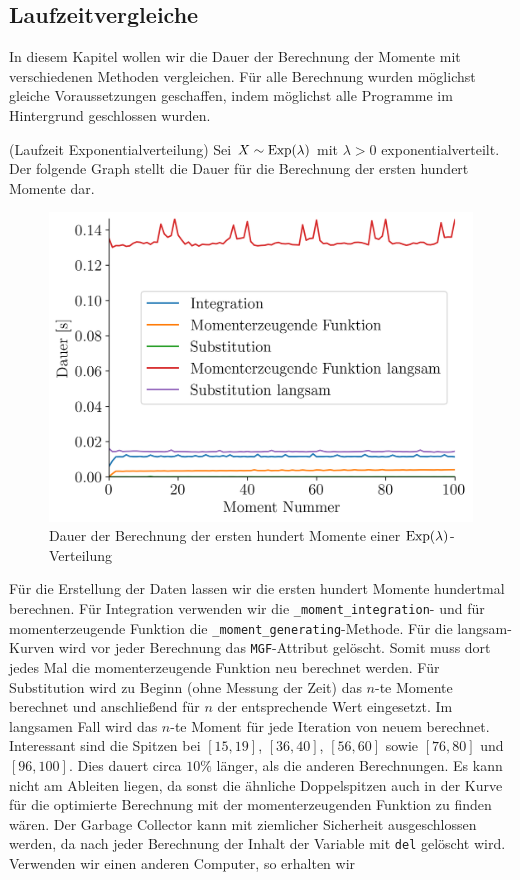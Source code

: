 \subsection{Laufzeitvergleiche}
\hypertarget{Sec:Laufzeit}{}

In diesem Kapitel wollen wir die Dauer der Berechnung der Momente mit verschiedenen Methoden vergleichen. Für alle Berechnung wurden möglichst gleiche Voraussetzungen geschaffen, indem möglichst alle Programme im Hintergrund geschlossen wurden.

\begin{Beispiel}{(Laufzeit Exponentialverteilung)}
Sei $X \sim \operatorname{Exp}(\lambda)$ mit $\lambda > 0$ exponentialverteilt. Der folgende Graph stellt die Dauer für die Berechnung der ersten hundert Momente dar.

\begin{figure}[H]
\centering
\includegraphics[width=0.5\linewidth]{./Section/Momente/Dauer Exp.png}
\vspace*{-.3\baselineskip}
\caption{Dauer der Berechnung der ersten hundert Momente einer $\operatorname{Exp}(\lambda)$-Verteilung}
\end{figure}

Für die Erstellung der Daten lassen wir die ersten hundert Momente hundertmal berechnen. Für Integration verwenden wir die \lstinline|_moment_integration|- und für momenterzeugende Funktion die \lstinline|_moment_generating|-Methode. Für die langsam-Kurven wird vor jeder Berechnung das \lstinline|MGF|-Attribut gelöscht. Somit muss dort jedes Mal die momenterzeugende Funktion neu berechnet werden. Für Substitution wird zu Beginn (ohne Messung der Zeit) das $n$-te Momente berechnet und anschließend für $n$ der entsprechende Wert eingesetzt. Im langsamen Fall wird das $n$-te Moment für jede Iteration von neuem berechnet.\\

Interessant sind die Spitzen bei $[15, 19]$, $[36, 40]$, $[56, 60]$ sowie $[76, 80]$ und $[96, 100]$. Dies dauert circa $10 \%$ länger, als die anderen Berechnungen. Es kann nicht am Ableiten liegen, da sonst die ähnliche Doppelspitzen auch in der Kurve für die optimierte Berechnung mit der momenterzeugenden Funktion zu finden wären. Der Garbage Collector kann mit ziemlicher Sicherheit ausgeschlossen werden, da nach jeder Berechnung der Inhalt der Variable mit \lstinline|del| gelöscht wird. Verwenden wir einen anderen Computer, so erhalten wir


\end{Beispiel}
